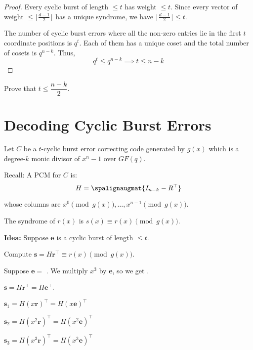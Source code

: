 \begin{proof}
    Every cyclic burst of length $ \leqslant t $ has weight $ \leqslant t $.
    Since every vector of weight $ \leqslant \lfloor \frac{d-1}{2} \rfloor $
    has a unique syndrome, we have $ \lfloor \frac{d-1}{2} \rfloor \leqslant t $.

    The number of cyclic burst errors where all the non-zero entries lie in the first
    $ t $ coordinate positions is $ q^t $. Each of them has a unique coset
    and the total number of cosets is $ q^{n-k} $. Thus,
    \[ q^t\leqslant q^{n-k}\implies t\leqslant n-k \]
\end{proof}

\begin{Exercise}{}{}
    Prove that $ t\leqslant \dfrac{n-k}{2} $.
\end{Exercise}

\section{Decoding Cyclic Burst Errors}
Let $ C $ be a $ t $-cyclic burst error correcting code generated
by $ g(x) $ which is a degree-$ k $ monic divisor of $ x^n-1 $ over $ GF(q) $.

Recall: A PCM for $ C $ is:
\[ H= \spalignaugmat{I_{n-k} -R^\top} \]

whose columns are $ x^0 \pmod{g(x)},\ldots ,x^{n-1} \pmod{g(x)} $.

The syndrome of $ r(x) $ is $ s(x)\equiv r(x)\pmod{g(x)} $.

\textbf{Idea:} Suppose $ \bm{e} $ is a cyclic burst of length $ \leqslant t $.

Compute $ \bm{s}=H\bm{r}^\top\equiv r(x)\pmod{g(x)} $.

Suppose $ \bm{e}= $ . We multiply $ x^3 $ by $ \bm{e} $,
so we get .

$ \bm{s}=H\bm{r}^\top=H\bm{e}^\top $.

$ \bm{s}_1=H(x\bm{r})^\top = H(x\bm{e})^\top $

$ \bm{s}_2=H(x^2\bm{r})^\top = H(x^2\bm{e})^\top $

$ \bm{s}_3=H(x^3\bm{r})^\top = H(x^3\bm{e})^\top $
